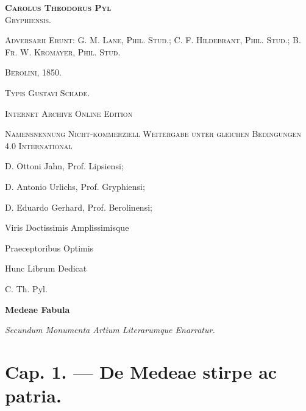 \documentclass[landscape, a4paper, 11pt, oneside, polutonikogreek, german]{article}
\begin{document}
\begin{titlepage}
        {\scshape \Large \textbf{Carolus Theodorus Pyl}\\\normalsize Gryphiensis.} %

	\vspace*{0.1\baselineskip} %

        {\scshape \scriptsize Adversarii Erunt: G. M. Lane, Phil. Stud.; C. F. Hildebrant, Phil. Stud.; B. Fr. W. Kromayer, Phil. Stud.}
        \vspace*{\fill}

	\vspace{1\baselineskip}

	{\small\scshape Berolini, 1850.}
	
	{\small\scshape{Typis Gustavi Schade.}}
	
	\vspace{0.25\baselineskip} %

        \scshape Internet Archive Online Edition%
	
	{\scshape\small Namensnennung Nicht-kommerziell Weitergabe unter gleichen Bedingungen 4.0 International} %
\end{titlepage}
\setlength{\parskip}{1mm plus1mm minus1mm}
\clearpage
\tableofcontents
\clearpage
\bfseries
\vspace*{\fill}

D. Ottoni Jahn, Prof. Lipsiensi;

D. Antonio Urlichs, Prof. Gryphiensi;

D. Eduardo Gerhard, Prof. Berolinensi;

Viris Doctissimis Amplissimisque

Praeceptoribus Optimis

Hunc Librum Dedicat

C. Th. Pyl.
\vspace*{\fill}
\clearpage
\begin{center}
\Huge\textbf{Medeae Fabula}

\large\emph{Secundum Monumenta Artium Literarumque Enarratur.}
\end{center}
\section{Cap. 1. --- De Medeae stirpe ac patria.}
\end{document}
